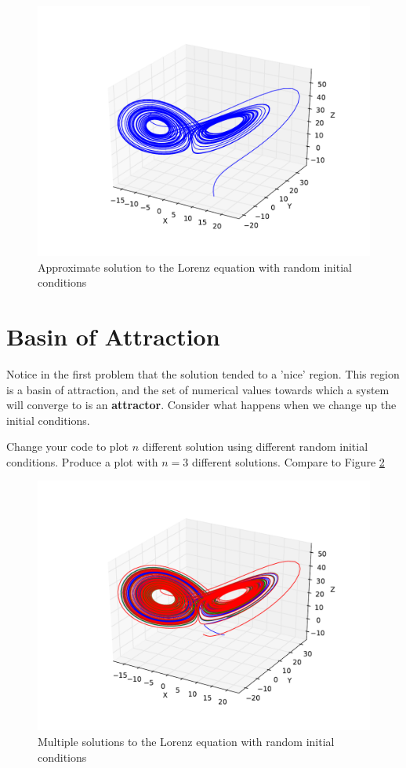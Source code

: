 \begin{figure}
\includegraphics[width=\textwidth]{figures/Single_Lorenz.pdf}
\caption{Approximate solution to the Lorenz equation with random initial conditions}
\label{fig:Single_Lorenz}
\end{figure}

\section*{Basin of Attraction}
Notice in the first problem that the solution tended to a 'nice' region.
This region is a basin of attraction, and the set of numerical values towards which a system will converge to is an \textbf{attractor}.
Consider what happens when we change up the initial conditions.
\begin{problem}
Change your code to plot $n$ different solution using different random initial conditions.
Produce a plot with $n=3$ different solutions.
Compare to Figure \ref{fig:Multiple_Lorenz}
\end{problem}

\begin{figure}
\includegraphics[width=\textwidth]{figures/Multiple_Lorenz.pdf}
\caption{Multiple solutions to the Lorenz equation with random initial conditions}
\label{fig:Multiple_Lorenz}
\end{figure}

